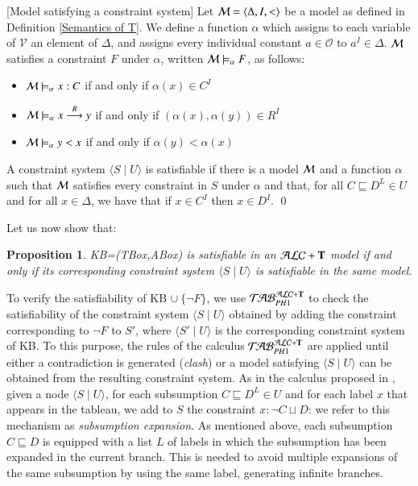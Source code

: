 \documentclass[a4paper, 11pt, oneside]{elsarticle}
\newcommand{\tip}{{\bf T}}
\newcommand{\alct}{\mathcal{ALC}+\tip}
\newcommand{\unione} {\cup}
\newcommand{\unioneq}{\sqcup}
\newcommand{\nott} {\lnot}
\newcommand{\tc} {\mid}
\newcommand{\sx} {\langle}
\newcommand{\dx} {\rangle}
\newcommand{\emme} {\begin{mathcal}M\end{mathcal}}
\newcommand{\primo}{\mathrel{{\mathcal{T}\!\mathcal{AB}}}_{PH 1}^{\mathcal{ALC}+\mbox{\scriptsize $\tip$}}}
\newcommand{\trans}[1]{\stackrel{#1}{\longrightarrow}}
\newenvironment{definition}
{\begin{defi} \rm}{\qed \end{defi}}
\newtheorem{proposition}{Proposition}
\newcounter{posu}
\newtheorem{proposition}[posu]{Proposition}
\newtheorem{definition}[posu]{Definition}
\begin{document}
\begin{definition}[Model satisfying a constraint system]\label{modello constraint}
Let $\emme=\sx \Delta, I, < \dx$ be a model as defined in Definition \ref{Semantics of T}. We define a function $\alpha$ which assigns to each variable of $\mathcal{V}$ an element of $\Delta$, and assigns every individual constant $a \in \mathcal{O}$ to $a^{I} \in \Delta$.
$\emme$ satisfies  a constraint $F$ under $\alpha$, written $\emme \models_\alpha F$, as follows:

\begin{itemize}
 \item $\emme \models_\alpha x: C$  if and only if $\alpha(x) \in C^{I}$
 \item $\emme \models_\alpha x \trans{R} y$ if and only if $(\alpha(x),\alpha(y)) \in R^{I}$
 \item $\emme \models_\alpha y < x$ if and only if $\alpha(y) < \alpha(x)$
\end{itemize}

A constraint system $\sx S \tc U \dx$ is satisfiable if there is a model $\emme$ and a function $\alpha$ such that $\emme$ satisfies  every constraint in $S$ under $\alpha$ and that, for all $C \sqsubseteq D^L \in U$ and for all $x \in \Delta$, we have that if $x \in C^I$ then $x \in D^I$.
\end{definition}

Let us now show that:

\begin{proposition}\label{corresp constr system} KB=(TBox,ABox) is satisfiable in an $\alct$ model if
and only if its corresponding constraint system $\sx S \tc U \dx$ is satisfiable in the same model.
\end{proposition}



\noindent To verify the satisfiability of KB $\unione \ \{ \nott F\}$, we use $\primo$ to check the satisfiability of the constraint system $\sx S \tc U \dx$ obtained by adding the constraint corresponding to $\nott F$ to $S'$, where $\sx S' \tc U \dx$ is the corresponding constraint system of KB. To this purpose, the rules of the calculus $\primo$ are applied until either a contradiction is generated (\emph{clash}) or a model satisfying $\sx S \tc U \dx$ can be obtained from the resulting constraint system.
As in the calculus proposed in \cite{FI09}, given a node $\sx S \tc U \dx$, for each subsumption $C \sqsubseteq D^L \in U$ and for each label $x$ that appears in the tableau, we add to $S$ the constraint $x: \nott C \unioneq D$: we refer to this mechanism as \emph{subsumption expansion}.
As mentioned above, each subsumption $C \sqsubseteq D$ is equipped with a list $L$ of labels in which the subsumption has been expanded in the current branch.
This is needed to avoid multiple expansions of the same subsumption by using the same label, generating infinite branches.
\end{document}

